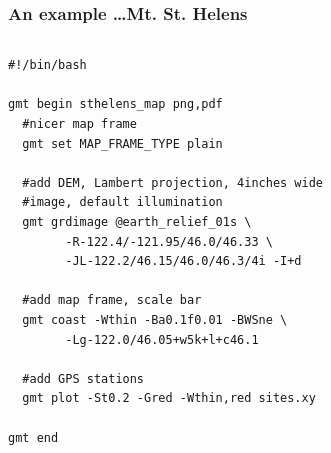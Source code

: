 \documentclass[unknownkeysallowed]{beamer}
\begin{document}
\begin{frame}[fragile=singleslide]
\frametitle{An example \dots Mt. St. Helens}
	\begin{columns}
		\tiny{
		\begin{verbatim}
#!/bin/bash

gmt begin sthelens_map png,pdf
  #nicer map frame
  gmt set MAP_FRAME_TYPE plain

  #add DEM, Lambert projection, 4inches wide 
  #image, default illumination
  gmt grdimage @earth_relief_01s \
        -R-122.4/-121.95/46.0/46.33 \
        -JL-122.2/46.15/46.0/46.3/4i -I+d

  #add map frame, scale bar
  gmt coast -Wthin -Ba0.1f0.01 -BWSne \
        -Lg-122.0/46.05+w5k+l+c46.1

  #add GPS stations
  gmt plot -St0.2 -Gred -Wthin,red sites.xy

gmt end		
		\end{verbatim}
}
		\begin{center}
		\end{center}
	\end{columns}
\end{frame}
\end{document}
